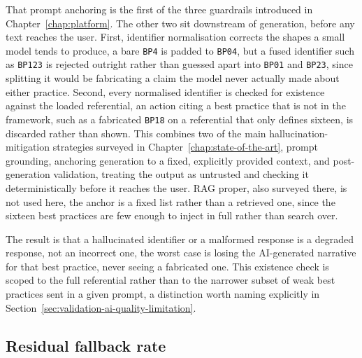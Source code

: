That prompt anchoring is the first of the three guardrails introduced in
Chapter~\ref{chap:platform}. The other two sit downstream of generation, before any
text reaches the user. First, identifier normalisation corrects the shapes a
small model
tends to produce, a bare \texttt{BP4} is padded to \texttt{BP04}, but a fused
identifier such as \texttt{BP123} is rejected outright rather than guessed
apart into \texttt{BP01} and \texttt{BP23}, since splitting it would be
fabricating a claim the model never actually made about either practice.
Second, every normalised identifier is checked for existence against the
loaded referential, an action citing a best practice that is not in the
framework, such as a fabricated \texttt{BP18} on a referential that only
defines sixteen, is discarded rather than shown. This combines two of the
main hallucination-mitigation strategies surveyed in
Chapter~\ref{chap:state-of-the-art}, prompt grounding, anchoring generation
to a fixed, explicitly provided context, and post-generation validation,
treating the output as untrusted and checking it deterministically before
it reaches the user. RAG proper, also surveyed
there, is not used here, the anchor is a fixed list rather than a retrieved
one, since the sixteen best practices are few enough to inject in full
rather than search over.

The result is that a hallucinated identifier or a malformed response is a
degraded response, not an incorrect one, the worst case is losing the
AI-generated narrative for that best practice, never seeing a fabricated one.
This existence check is scoped to the full referential rather than to the
narrower subset of weak best practices sent in a given prompt, a distinction
worth naming explicitly in Section~\ref{sec:validation-ai-quality-limitation}.

\subsection{Residual fallback rate}
\label{sec:validation-fallback-rate}


